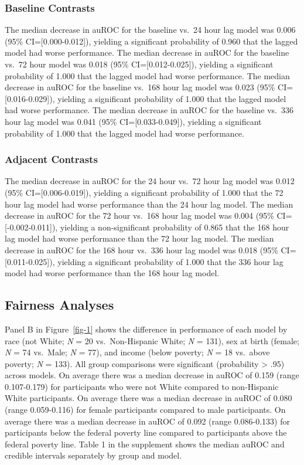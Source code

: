 \documentclass[
]{agujournal2019}
\begin{document}
\subsubsection{Baseline Contrasts}\label{baseline-contrasts}

The median decrease in auROC for the baseline vs.~24 hour lag model was
0.006 (95\% CI={[}0.000-0.012{]}), yielding a significant probability of
0.960 that the lagged model had worse performance. The median decrease
in auROC for the baseline vs.~72 hour model was 0.018 (95\%
CI={[}0.012-0.025{]}), yielding a significant probability of 1.000 that
the lagged model had worse performance. The median decrease in auROC for
the baseline vs.~168 hour lag model was 0.023 (95\%
CI={[}0.016-0.029{]}), yielding a significant probability of 1.000 that
the lagged model had worse performance. The median decrease in auROC for
the baseline vs.~336 hour lag model was 0.041 (95\%
CI={[}0.033-0.049{]}), yielding a significant probability of 1.000 that
the lagged model had worse performance.

\subsubsection{Adjacent Contrasts}\label{adjacent-contrasts}

The median decrease in auROC for the 24 hour vs.~72 hour lag model was
0.012 (95\% CI={[}0.006-0.019{]}), yielding a significant probability of
1.000 that the 72 hour lag model had worse performance than the 24 hour
lag model. The median decrease in auROC for the 72 hour vs.~168 hour lag
model was 0.004 (95\% CI={[}-0.002-0.011{]}), yielding a non-significant
probability of 0.865 that the 168 hour lag model had worse performance
than the 72 hour lag model. The median decrease in auROC for the 168
hour vs.~336 hour lag model was 0.018 (95\% CI={[}0.011-0.025{]}),
yielding a significant probability of 1.000 that the 336 hour lag model
had worse performance than the 168 hour lag model.

\subsection{Fairness Analyses}\label{fairness-analyses-1}

Panel B in Figure~\ref{fig-1} shows the difference in performance of
each model by race (not White; \emph{N} = 20 vs.~Non-Hispanic White;
\emph{N} = 131), sex at birth (female; \emph{N} = 74 vs.~Male; \emph{N}
= 77), and income (below poverty; \emph{N} = 18 vs.~above poverty;
\emph{N} = 133). All group comparisons were significant (probability
\textgreater{} .95) across models. On average there was a median
decrease in auROC of 0.159 (range 0.107-0.179) for participants who were
not White compared to non-Hispanic White participants. On average there
was a median decrease in auROC of 0.080 (range 0.059-0.116) for female
participants compared to male participants. On average there was a
median decrease in auROC of 0.092 (range 0.086-0.133) for participants
below the federal poverty line compared to participants above the
federal poverty line. Table 1 in the supplement shows the median auROC
and credible intervals separately by group and model.
\end{document}
